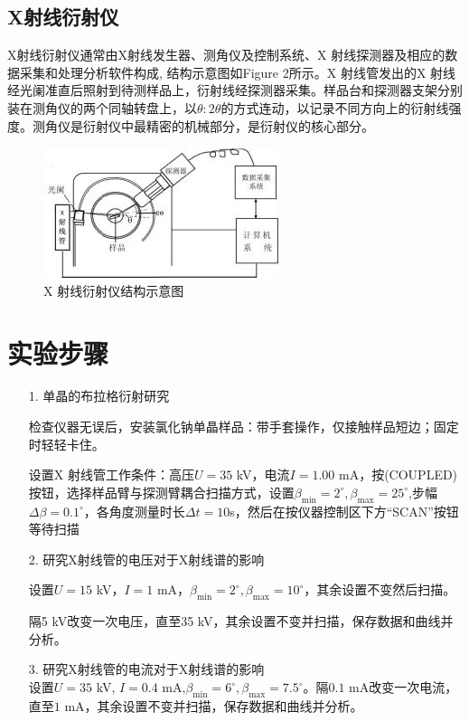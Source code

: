 \documentclass[10.5pt]{article}
\renewcommand{\=}[1]{\stackrel{#1}{=}} %
\theoremstyle{definition}
\theoremstyle{remark}
\begin{document}
	\subsection{X射线衍射仪}
	X射线衍射仪通常由X射线发生器、测角仪及控制系统、X 射线探测器及相应的数据采集和处理分析软件构成, 结构示意图如Figure 2所示。X 射线管发出的X 射线经光阑准直后照射到待测样品上，衍射线经探测器采集。样品台和探测器支架分别装在测角仪的两个同轴转盘上，以$\theta:2\theta$的方式连动，以记录不同方向上的衍射线强度。测角仪是衍射仪中最精密的机械部分，是衍射仪的核心部分。
	\begin{figure}[H]
		\centering
		\includegraphics[scale=0.7]{2.jpg}
		\captionsetup{font=footnotesize}
		\caption{X 射线衍射仪结构示意图}
	\end{figure}
	\section{实验步骤}
	\begin{itemize}
		\item [1.] 单晶的布拉格衍射研究\par 
		检查仪器无误后，安装氯化钠单晶样品：带手套操作，仅接触样品短边；固定时轻轻卡住。
		
		设置X 射线管工作条件：高压$U=35$ kV，电流$I=1.00$ mA，按(COUPLED)按钮，选择样品臂与探测臂耦合扫描方式，设置$\beta_{\min}=2^\circ,\beta_{\max}=25^\circ$,步幅$\Delta\beta=0.1^\circ$，各角度测量时长$\Delta t=10 $s，然后在按仪器控制区下方“SCAN”按钮等待扫描
		\item [2.] 研究X射线管的电压对于X射线谱的影响\par 
		设置$U=15$ kV，$I=1$ mA，$\beta_{\min}=2^\circ,\beta_{\max}=10^\circ$，其余设置不变然后扫描。
		
		隔5 kV改变一次电压，直至35 kV，其余设置不变并扫描，保存数据和曲线并分析。
		
		\item [3.]研究X射线管的电流对于X射线谱的影响\\
		设置$U=35$ kV, $I=0.4$ mA,$\beta_{\min}=6^\circ,\beta_{\max}=7.5^\circ$。隔$0.1$ mA改变一次电流，直至$1$ mA，其余设置不变并扫描，保存数据和曲线并分析。
	\end{itemize}
\end{document}
